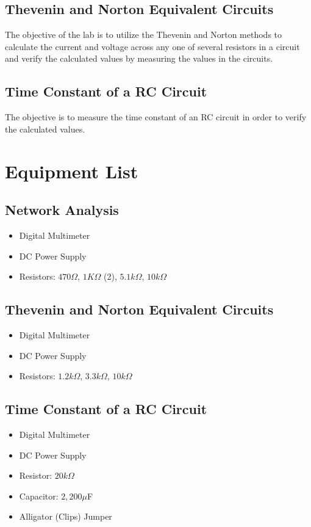 \documentclass[a4paper]{article}
\begin{document}
\subsection{Thevenin and Norton Equivalent Circuits}
The objective of the lab is to utilize the Thevenin and Norton methods to calculate the current and voltage across any one of several resistors in a circuit and verify the calculated values by measuring the values in the circuits.
\subsection{Time Constant of a RC Circuit}
The objective is to measure the time constant of an RC circuit in order to verify the calculated values.
\section{Equipment List}
\subsection{Network Analysis}

\begin{itemize}
    \item Digital Multimeter
    \item DC Power Supply
    \item Resistors: $470\Omega$, $1K\Omega$ (2), $5.1k\Omega$, $10k\Omega$ 
\end{itemize}

\subsection{Thevenin and Norton Equivalent Circuits}
\begin{itemize}
    \item Digital Multimeter
    \item DC Power Supply
    \item Resistors: $1.2k\Omega$, $3.3k\Omega$, $10k\Omega$
\end{itemize}
\subsection{Time Constant of a RC Circuit}
\begin{itemize}
    \item Digital Multimeter
    \item DC Power Supply
    \item Resistor: $20k\Omega$
    \item Capacitor: $2,200 \mu$F
    \item Alligator (Clips) Jumper
\end{itemize}
\end{document}

